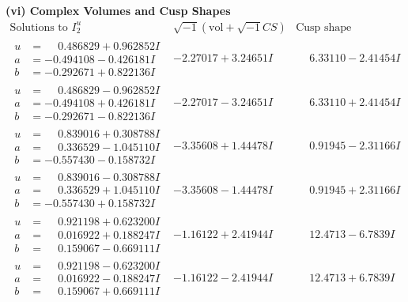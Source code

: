 \documentclass[1p]{elsarticle_modified}
\theoremstyle{definition}
\newcommand{\I}{\sqrt{-1}}
\begin{document}
\newpage\flushleft \textbf{(vi) Complex Volumes and Cusp Shapes}
$$\begin{array}{c|c|c}  
\text{Solutions to }I^u_{2}& \I (\text{vol} + \sqrt{-1}CS) & \text{Cusp shape}\\
 \hline 
\begin{aligned}
u &= \phantom{-}0.486829 + 0.962852 I \\
a &= -0.494108 - 0.426181 I \\
b &= -0.292671 + 0.822136 I\end{aligned}
 & -2.27017 + 3.24651 I & \phantom{-}6.33110 - 2.41454 I \\ \hline\begin{aligned}
u &= \phantom{-}0.486829 - 0.962852 I \\
a &= -0.494108 + 0.426181 I \\
b &= -0.292671 - 0.822136 I\end{aligned}
 & -2.27017 - 3.24651 I & \phantom{-}6.33110 + 2.41454 I \\ \hline\begin{aligned}
u &= \phantom{-}0.839016 + 0.308788 I \\
a &= \phantom{-}0.336529 - 1.045110 I \\
b &= -0.557430 - 0.158732 I\end{aligned}
 & -3.35608 + 1.44478 I & \phantom{-}0.91945 - 2.31166 I \\ \hline\begin{aligned}
u &= \phantom{-}0.839016 - 0.308788 I \\
a &= \phantom{-}0.336529 + 1.045110 I \\
b &= -0.557430 + 0.158732 I\end{aligned}
 & -3.35608 - 1.44478 I & \phantom{-}0.91945 + 2.31166 I \\ \hline\begin{aligned}
u &= \phantom{-}0.921198 + 0.623200 I \\
a &= \phantom{-}0.016922 + 0.188247 I \\
b &= \phantom{-}0.159067 - 0.669111 I\end{aligned}
 & -1.16122 + 2.41944 I & \phantom{-}12.4713 - 6.7839 I \\ \hline\begin{aligned}
u &= \phantom{-}0.921198 - 0.623200 I \\
a &= \phantom{-}0.016922 - 0.188247 I \\
b &= \phantom{-}0.159067 + 0.669111 I\end{aligned}
 & -1.16122 - 2.41944 I & \phantom{-}12.4713 + 6.7839 I \\ \hline\begin{aligned}

\end{aligned}
\end{array}$$
\end{document}

